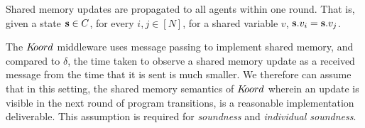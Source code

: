 \begin{assumption} Shared memory updates are propagated to all agents within one round. That is, given a state ${\textbf{s}}\in C$, for every  $i,j \in [N]$, for a shared variable $v$, ${\textbf{s}}.v_i = {\textbf{s}}.v_j$.
\end{assumption}
The $K\kern-2pt oord$ middleware uses message passing to implement shared memory, and compared to $\delta$, the time taken to observe a shared memory update as a received message from the time that it is sent is much smaller. We therefore can assume that in this setting, the shared memory semantics of $K\kern-2pt oord$ wherein an update is visible in the next round of program transitions, is a reasonable implementation deliverable. This assumption is required for \emph{soundness} and \emph{individual soundness}.








%

